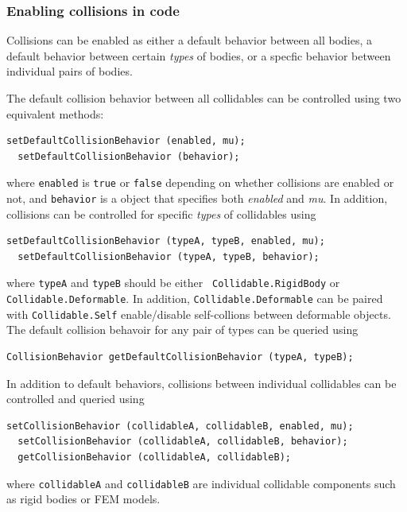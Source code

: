 
\subsubsection{Enabling collisions in code}

Collisions can be enabled as either a default behavior between all
bodies, a default behavior between certain {\it types} of
bodies, or a specfic behavior between individual pairs of bodies.

The default collision behavior between all collidables can be
controlled using two equivalent methods:
%
\begin{lstlisting}[]
  setDefaultCollisionBehavior (enabled, mu);
  setDefaultCollisionBehavior (behavior);
\end{lstlisting}
%
where {\tt enabled} is {\tt true} or {\tt false} depending on whether
collisions are enabled or not, and {\tt behavior} is a
 object that
specifies both {\it enabled} and {\it mu}.
In addition, collisions can be controlled for specific {\it types}
of collidables using
%
\begin{lstlisting}[]
  setDefaultCollisionBehavior (typeA, typeB, enabled, mu);
  setDefaultCollisionBehavior (typeA, typeB, behavior);
\end{lstlisting}
%
where {\tt typeA} and {\tt typeB} should be either {\tt
Collidable.RigidBody} or {\tt Collidable.Deformable}.  In addition,
{\tt Collidable.Deformable} can be paired with {\tt Collidable.Self}
enable/disable self-collions between deformable objects.
The default collision behavoir for any pair of types can
be queried using
%
\begin{lstlisting}[]
  CollisionBehavior getDefaultCollisionBehavior (typeA, typeB);
\end{lstlisting}
%

In addition to default behaviors, collisions between individual
collidables can be controlled and queried using
%
\begin{lstlisting}[]
  setCollisionBehavior (collidableA, collidableB, enabled, mu);
  setCollisionBehavior (collidableA, collidableB, behavior);
  getCollisionBehavior (collidableA, collidableB);
\end{lstlisting}
%
where {\tt collidableA} and {\tt collidableB} are individual
collidable components such as rigid bodies or FEM models.

